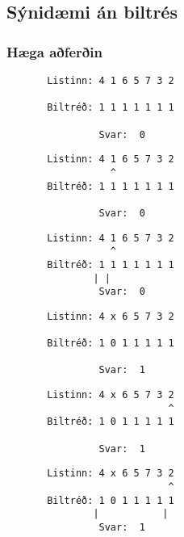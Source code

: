 \subsection{Sýnidæmi án biltrés}
{
    \frametitle{Hæga aðferðin}
}

{ \begin{verbatim}
       Listinn: 4 1 6 5 7 3 2

       Biltréð: 1 1 1 1 1 1 1

                Svar:  0
\end{verbatim}}
{ \begin{verbatim}
       Listinn: 4 1 6 5 7 3 2
                  ^
       Biltréð: 1 1 1 1 1 1 1

                Svar:  0
\end{verbatim}}
{ \begin{verbatim}
       Listinn: 4 1 6 5 7 3 2
                  ^
       Biltréð: 1 1 1 1 1 1 1
               | |
                Svar:  0
\end{verbatim}}
{ \begin{verbatim}
       Listinn: 4 x 6 5 7 3 2

       Biltréð: 1 0 1 1 1 1 1

                Svar:  1
\end{verbatim}}
{ \begin{verbatim}
       Listinn: 4 x 6 5 7 3 2
                            ^
       Biltréð: 1 0 1 1 1 1 1

                Svar:  1
\end{verbatim}}
{ \begin{verbatim}
       Listinn: 4 x 6 5 7 3 2
                            ^
       Biltréð: 1 0 1 1 1 1 1
               |           |
                Svar:  1
\end{verbatim}}
